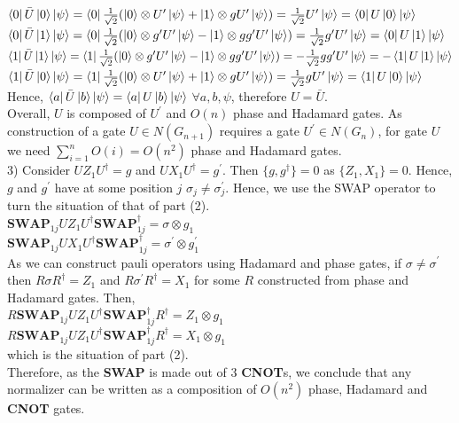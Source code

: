 \documentclass[a4paper,12pt]{article}
\begin{document}
$\bra{0}\bar{U}\ket{0}\ket{\psi}=\bra{0}\frac{1}{\sqrt{2}}
(\ket{0}\otimes U^\prime \ket{\psi}+\ket{1}\otimes gU^\prime\ket{\psi})=
\frac{1}{\sqrt{2}}U^\prime\ket{\psi}=\bra{0}U\ket{0}\ket{\psi}$\\
$\bra{0}\bar{U}\ket{1}\ket{\psi}=\bra{0}\frac{1}{\sqrt{2}}
(\ket{0}\otimes g^\prime U^\prime \ket{\psi}-\ket{1}\otimes gg^\prime U^\prime\ket{\psi})=
\frac{1}{\sqrt{2}}g^\prime U^\prime\ket{\psi}=\bra{0}U\ket{1}\ket{\psi}$\\
$\bra{1}\bar{U}\ket{1}\ket{\psi}=\bra{1}\frac{1}{\sqrt{2}}
(\ket{0}\otimes g^\prime U^\prime \ket{\psi}-\ket{1}\otimes gg^\prime U^\prime\ket{\psi})=
-\frac{1}{\sqrt{2}}gg^\prime U^\prime\ket{\psi}=-\bra{1}U\ket{1}\ket{\psi}$\\
$\bra{1}\bar{U}\ket{0}\ket{\psi}=\bra{1}\frac{1}{\sqrt{2}}
(\ket{0}\otimes U^\prime \ket{\psi}+\ket{1}\otimes gU^\prime\ket{\psi})=
\frac{1}{\sqrt{2}}gU^\prime\ket{\psi}=\bra{1}U\ket{0}\ket{\psi}$\\
Hence, $\bra{a}\bar{U}\ket{b}\ket{\psi}=\bra{a}U\ket{b}\ket{\psi}$ $\forall a,b,\psi$, therefore
$U=\bar{U}$.\\
Overall, $U$ is composed of $U^\prime$ and $O(n)$ phase and Hadamard
gates. As construction of a gate $U\in N(G_{n+1})$ requires a gate
$U^\prime \in N(G_n)$, for gate $U$ we need $\displaystyle\sum_{i=1}^nO(i)=O(n^2)$ phase and
Hadamard gates.\\
3) Consider $UZ_1U^\dagger = g$ and $UX_1U^\dagger=g^\prime$. Then 
$\{g,g^\dagger\}=0$ as $\{Z_1,X_1\}=0$. Hence, $g$ and $g^\prime$ have at
some position $j$ $\sigma_j\neq\sigma_j^\prime$. Hence, we use the SWAP operator to turn the
situation of that of part (2).\\
$\textbf{SWAP}_{1j}UZ_1U^\dagger\textbf{SWAP}_{1j}^\dagger=\sigma\otimes g_1$\\
$\textbf{SWAP}_{1j}UX_1U^\dagger\textbf{SWAP}_{1j}^\dagger=\sigma^\prime\otimes g_1^\prime$\\
As we can construct pauli operators using Hadamard and phase gates,
if $\sigma\neq\sigma^\prime$ then $R\sigma R^\dagger=Z_1$ and $R\sigma^\prime R^\dagger=X_1$
for some $R$ constructed from phase and Hadamard gates. Then,\\
$R\textbf{SWAP}_{1j}UZ_1U^\dagger\textbf{SWAP}_{1j}^\dagger R^\dagger=Z_1\otimes g_1$\\
$R\textbf{SWAP}_{1j}UZ_1U^\dagger\textbf{SWAP}_{1j}^\dagger R^\dagger=X_1\otimes g_1$\\
which is the situation of part (2).\\
Therefore, as the \textbf{SWAP} is made out of 3 \textbf{CNOT}s, we conclude
that any normalizer can be written as a composition of $O(n^2)$ phase, Hadamard and
\textbf{CNOT} gates.
\end{document}
